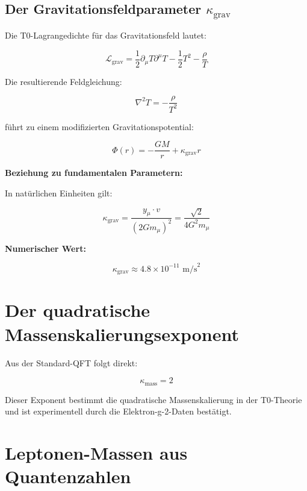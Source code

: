 \documentclass[12pt,a4paper]{article}
\begin{document}
	\subsection{Der Gravitationsfeldparameter $\kappa_{\text{grav}}$}
	
	Die T0-Lagrangedichte für das Gravitationsfeld lautet:
	
	\begin{equation}
		\mathcal{L}_{\text{grav}} = \frac{1}{2}\partial_\mu T \partial^\mu T - \frac{1}{2}T^2 - \frac{\rho}{T}
	\end{equation}
	
	Die resultierende Feldgleichung:
	
	\begin{equation}
		\nabla^2 T = -\frac{\rho}{T^2}
	\end{equation}
	
	führt zu einem modifizierten Gravitationspotential:
	
	\begin{equation}
		\Phi(r) = -\frac{GM}{r} + \kappa_{\text{grav}} r
	\end{equation}
	
	\textbf{Beziehung zu fundamentalen Parametern:}
	
	In natürlichen Einheiten gilt:
	
	\begin{equation}
		\kappa_{\text{grav}} = \frac{y_\mu \cdot v}{(2Gm_\mu)^2} = \frac{\sqrt{2}}{4G^2m_\mu}
	\end{equation}
	
	\textbf{Numerischer Wert:}
	
	\begin{equation}
		\kappa_{\text{grav}} \approx 4.8 \times 10^{-11} \text{ m/s}^2
	\end{equation}
	
	\section{Der quadratische Massenskalierungsexponent}
	
	Aus der Standard-QFT folgt direkt:
	
	\begin{equation}
		\kappa_{\text{mass}} = 2
	\end{equation}
	
	Dieser Exponent bestimmt die quadratische Massenskalierung in der T0-Theorie und ist experimentell durch die Elektron-g-2-Daten bestätigt.
	
	\section{Leptonen-Massen aus Quantenzahlen}
	
\end{document}
